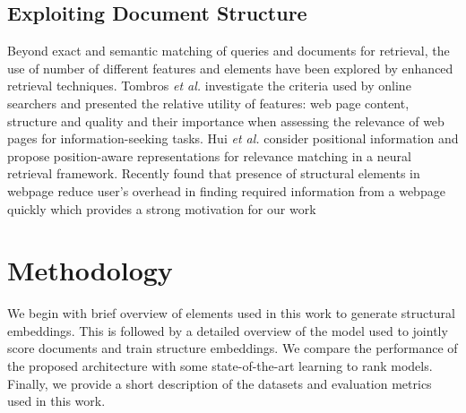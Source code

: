 \documentclass[runningheads,a4paper]{llncs}
\begin{document}
\subsection{Exploiting Document Structure}
Beyond exact and semantic matching of queries and documents for retrieval, the 
use of number of different features and elements have been explored by enhanced 
retrieval techniques. Tombros \textit{et al.} \cite{tombros2005users} 
investigate the criteria used by online searchers  and presented the relative 
utility of features: web page content,
structure and quality and their importance when assessing the relevance of web 
pages for information-seeking tasks. Hui \textit{et al.}\cite{hui2017position} 
consider positional information and propose position-aware representations for 
relevance matching in a neural retrieval framework. Recently  \cite{verma2016obtaining} 
found that presence of structural elements in webpage reduce user's overhead in finding 
required information from a webpage quickly which provides a strong motivation for our work 





\section{Methodology}
\label{sec:methodology}
We begin with brief overview of elements used in this work to generate structural embeddings. 
This is followed by a detailed overview of the model used to jointly score documents and train 
structure embeddings. We compare the performance of the proposed architecture with some 
state-of-the-art learning to rank models. Finally, we provide a short description of the 
datasets and evaluation metrics used in this work.
\end{document}
